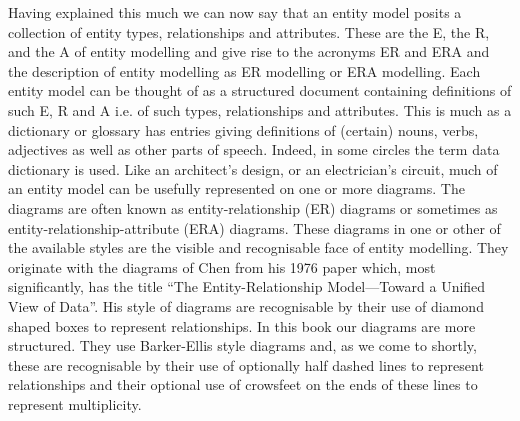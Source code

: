 \mynote Having explained this much we can now say that an entity model posits a collection of entity types, relationships and attributes. These are the E, the R, and the A of entity modelling and give rise to the acronyms ER and ERA and the description of entity modelling as ER modelling or ERA modelling.
Each entity model can be thought of as a structured document containing definitions of such  
E, R and A i.e. of such types, relationships and attributes. 
This is much  as a dictionary or glossary has entries giving definitions of (certain) nouns, verbs, adjectives as well as other parts of speech. Indeed, in some circles the term data dictionary is used. Like an architect's design, or an electrician's circuit, much of an entity model can be usefully represented on one or more diagrams. The diagrams are often known as entity-relationship (ER) diagrams or sometimes as  entity-relationship-attribute (ERA) diagrams. 
These diagrams in one or other of the available styles are the visible and recognisable face of entity modelling. They originate with the diagrams of Chen from his 1976 paper which, most significantly, has the title ``The Entity-Relationship Model---Toward a Unified View of Data''. His style of diagrams are recognisable by their use of diamond shaped boxes to represent relationships. In this book our diagrams are more structured. They use Barker-Ellis style diagrams and, as we come to shortly, these are recognisable by their use of optionally half dashed lines to represent relationships and their optional use of crowsfeet on the ends of these lines to represent multiplicity. 

